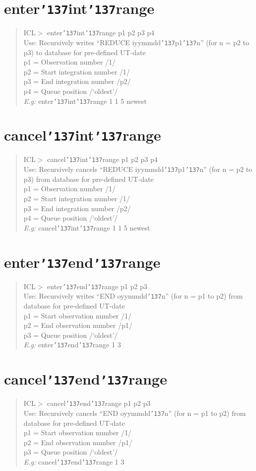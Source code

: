 \documentclass[a4paper]{book}
\renewcommand{\_}{{\tt\char'137}}
\begin{document}
\section{enter\_int\_range}
\begin{quote}
ICL$>$ enter\_int\_range p1 p2 p3 p4 \\
Use: Recursively writes ``REDUCE iyymmdd\_p1\_n'' 
(for n = p2 to p3) to database for pre-defined UT-date \\
p1 = Observation number /1/ \\
p2 = Start integration number /1/ \\
p3 = End integration number /p2/ \\
p4 = Queue position /`oldest'/ \\
{\em E.g:} enter\_int\_range 1 1 5 newest
\end{quote}
\section{cancel\_int\_range}
\begin{quote}
ICL$>$ cancel\_int\_range p1 p2 p3 p4 \\
Use: Recursively cancels ``REDUCE iyymmdd\_p1\_n'' 
(for n = p2 to p3) from database for pre-defined UT-date \\
p1 = Observation number /1/ \\
p2 = Start integration number /1/ \\
p3 = End integration number /p2/ \\
p4 = Queue position /`oldest'/ \\
{\em E.g:} cancel\_int\_range 1 1 5 newest
\end{quote}
\section{enter\_end\_range}
\begin{quote}
ICL$>$ enter\_end\_range p1 p2 p3 \\
Use: Recursively writes ``END oyymmdd\_n'' (for n = p1 to p2) 
 from database for pre-defined UT-date \\
p1 = Start observation number /1/ \\
p2 = End observation number /p1/ \\
p3 = Queue position /`oldest'/ \\
{\em E.g:} enter\_end\_range 1 3 
\end{quote}
\section{cancel\_end\_range}
\begin{quote}
ICL$>$ cancel\_end\_range p1 p2 p3 \\
Use: Recursively cancels ``END oyymmdd\_n'' (for n = p1 to p2) 
 from database for pre-defined UT-date \\
p1 = Start observation number /1/ \\
p2 = End observation number /p1/ \\
p3 = Queue position /`oldest'/ \\
{\em E.g:} cancel\_end\_range 1 3
\end{quote}
\end{document}
